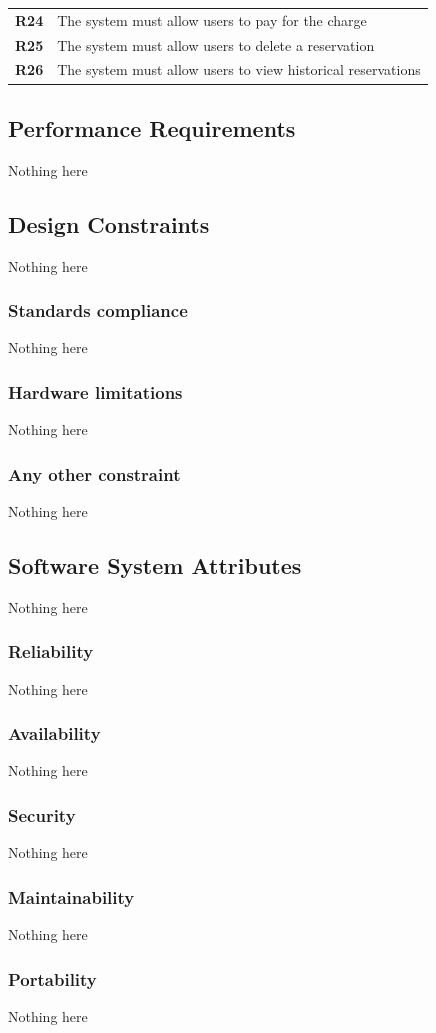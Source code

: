 \begin{table}[H]
\begin{tabularx}{\textwidth}{cX}
        \textbf{R24} & The system must allow users to pay for the charge                                                                   \\
        \textbf{R25} & The system must allow users to delete a reservation                                                                 \\
        \textbf{R26} & The system must allow users to view historical reservations                                                         \\ \bottomrule
    \end{tabularx}
\end{table}

\subsection{Performance Requirements}
Nothing here

\subsection{Design Constraints}
Nothing here

\subsubsection{Standards compliance}
Nothing here

\subsubsection{Hardware limitations}
Nothing here

\subsubsection{Any other constraint}
Nothing here


\subsection{Software System Attributes}
Nothing here

\subsubsection{Reliability}
Nothing here

\subsubsection{Availability}
Nothing here

\subsubsection{Security}
Nothing here

\subsubsection{Maintainability}
Nothing here

\subsubsection{Portability}
Nothing here
